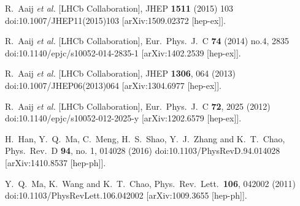 \documentclass[12pt]{article}
\begin{document}
\begin{thebibliography}{1}
  R.~Aaij {\it et al.} [LHCb Collaboration],
  JHEP {\bf 1511} (2015) 103
  doi:10.1007/JHEP11(2015)103
  [arXiv:1509.02372 [hep-ex]].

  R.~Aaij {\it et al.} [LHCb Collaboration],
  Eur.\ Phys.\ J.\ C {\bf 74} (2014) no.4,  2835
  doi:10.1140/epjc/s10052-014-2835-1
  [arXiv:1402.2539 [hep-ex]].

  R.~Aaij {\it et al.} [LHCb Collaboration],
  JHEP {\bf 1306}, 064 (2013)
  doi:10.1007/JHEP06(2013)064
  [arXiv:1304.6977 [hep-ex]].

  R.~Aaij {\it et al.} [LHCb Collaboration],
  Eur.\ Phys.\ J.\ C {\bf 72}, 2025 (2012)
  doi:10.1140/epjc/s10052-012-2025-y
  [arXiv:1202.6579 [hep-ex]].

  H.~Han, Y.~Q.~Ma, C.~Meng, H.~S.~Shao, Y.~J.~Zhang and K.~T.~Chao,
  Phys.\ Rev.\ D {\bf 94}, no. 1, 014028 (2016)
  doi:10.1103/PhysRevD.94.014028
  [arXiv:1410.8537 [hep-ph]].

  Y.~Q.~Ma, K.~Wang and K.~T.~Chao,
  Phys.\ Rev.\ Lett.\  {\bf 106}, 042002 (2011)
  doi:10.1103/PhysRevLett.106.042002
  [arXiv:1009.3655 [hep-ph]].


\end{thebibliography}
\end{document}
